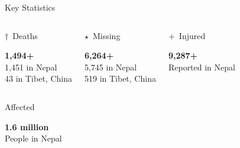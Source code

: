 \documentclass[aspectratio=169, 12pt]{beamer}
\begin{document}
	\begin{frame}{Key Statistics}
		\begin{columns}[c]
			\begin{block}{$\dagger$\ Deaths}
				\centering
				\begin{minipage}[c][2.2cm][c]{0.9\linewidth}
					\centering
					\vspace{0pt}
					{\color{rpLove}\bfseries\huge 1{,}494+}\\[6pt]
					{\small 1{,}451 in Nepal\\43 in Tibet, China}
					\vspace{0pt}
				\end{minipage}
			\end{block}
			
			\begin{block}{$\star$\ Missing}
				\centering
				\begin{minipage}[c][2.2cm][c]{0.9\linewidth}
					\centering
					\vspace{0pt}
					{\color{rpGold}\bfseries\huge 6{,}264+}\\[6pt]
					{\small 5{,}745 in Nepal\\519 in Tibet, China}
					\vspace{0pt}
				\end{minipage}
			\end{block}
			
			\begin{block}{$+$\ Injured}
				\centering
				\begin{minipage}[c][2.2cm][c]{0.9\linewidth}
					\centering
					\vspace{0pt}
					{\color{rpFoam}\bfseries\huge 9{,}287+}\\[6pt]
					{\small Reported in Nepal}
					\vspace{0pt}
				\end{minipage}
			\end{block}
		\end{columns}
		
		\vspace{10pt}
		
		\begin{columns}[c]
			\begin{exampleblock}{Affected}
				\centering
				\begin{minipage}[c][2.2cm][c]{0.9\linewidth}
					\centering
					\vspace{0pt}
					{\color{rpGold}\bfseries\Large 1.6 million}\\[6pt]
					{\small People in Nepal}
					\vspace{0pt}
				\end{minipage}
			\end{exampleblock}
			

\end{columns}
\end{frame}
\end{document}
